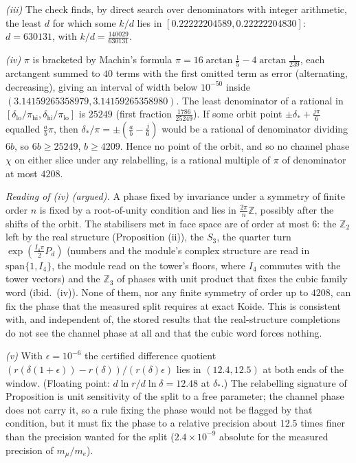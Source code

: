 \emph{(iii)} The check finds, by direct search over denominators with integer arithmetic, the least $d$ for which some $k/d$ lies in $[0.22222204589, 0.22222204830]$: $d = 630131$, with $k/d = \tfrac{140029}{630131}$.

\emph{(iv)} $\pi$ is bracketed by Machin's formula $\pi = 16\arctan\tfrac15 - 4\arctan\tfrac{1}{239}$, each arctangent summed to $40$ terms with the first omitted term as error (alternating, decreasing), giving an interval of width below $10^{-50}$ inside $(3.14159265358979, 3.14159265358980)$. The least denominator of a rational in $[\delta_{\mathrm{lo}}/\pi_{\mathrm{hi}}, \delta_{\mathrm{hi}}/\pi_{\mathrm{lo}}]$ is $25249$ (first fraction $\tfrac{1786}{25249}$). If some orbit point $\pm\delta_{*} + \tfrac{j\pi}{6}$ equalled $\tfrac{a}{b}\pi$, then $\delta_{*}/\pi = \pm(\tfrac{a}{b} - \tfrac{j}{6})$ would be a rational of denominator dividing $6b$, so $6b \ge 25249$, $b \ge 4209$. Hence no point of the orbit, and so no channel phase $\chi$ on either slice under any relabelling, is a rational multiple of $\pi$ of denominator at most $4208$.

\emph{Reading of (iv) (argued).} A phase fixed by invariance under a symmetry of finite order $n$ is fixed by a root-of-unity condition and lies in $\tfrac{2\pi}{n}\mathbb{Z}$, possibly after the shifts of the orbit. The stabilisers met in face space are of order at most $6$: the $\mathbb{Z}_{2}$ left by the real structure (Proposition (ii)), the $S_{3}$, the quarter turn $\exp(\tfrac{I_4\pi}{2}P_{d})$ (numbers and the module's complex structure are read in $\mathrm{span}\{1, I_4\}$, the module read on the tower's floors, where $I_4$ commutes with the tower vectors) and the $\mathbb{Z}_{3}$ of phases with unit product that fixes the cubic family word (ibid.\ (iv)). None of them, nor any finite symmetry of order up to $4208$, can fix the phase that the measured split requires at exact Koide. This is consistent with, and independent of, the stored results that the real-structure completions do not see the channel phase at all and that the cubic word forces nothing.

\emph{(v)} With $\epsilon = 10^{-6}$ the certified difference quotient $(r(\delta(1 + \epsilon)) - r(\delta))/(r(\delta)\epsilon)$ lies in $(12.4, 12.5)$ at both ends of the window. (Floating point: $d\ln r/d\ln\delta = 12.48$ at $\delta_{*}$.) The relabelling signature of Proposition  is unit sensitivity of the split to a free parameter; the channel phase does not carry it, so a rule fixing the phase would not be flagged by that condition, but it must fix the phase to a relative precision about $12.5$ times finer than the precision wanted for the split ($2.4 \times 10^{-9}$ absolute for the measured precision of $m_{\mu}/m_{e}$).

